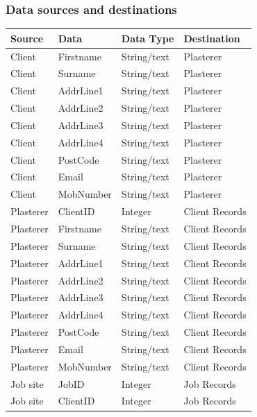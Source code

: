 \subsubsection{Data sources and destinations}



\begin{flushleft}
\begin{longtable}{|p{3cm}|p{3cm}|p{3cm}|p{3cm}|}
\hline
\textbf{Source} & \textbf{Data} & \textbf{Data Type} & \textbf{Destination}  \\ \hline
Client & Firstname & String/text & Plasterer \\ \hline 
Client & Surname   & String/text & Plasterer \\ \hline
Client & AddrLine1 & String/text & Plasterer \\ \hline
Client & AddrLine2 & String/text & Plasterer \\ \hline
Client & AddrLine3 & String/text & Plasterer \\ \hline
Client & AddrLine4 & String/text & Plasterer \\ \hline
Client & PostCode  & String/text & Plasterer \\ \hline
Client & Email     & String/text & Plasterer \\ \hline
Client & MobNumber & String/text & Plasterer \\ \hline   
Plasterer & ClientID & Integer & Client Records \\ \hline
Plasterer & Firstname & String/text & Client Records \\ \hline 
Plasterer & Surname   & String/text & Client Records \\ \hline
Plasterer & AddrLine1 & String/text & Client Records \\ \hline
Plasterer & AddrLine2 & String/text & Client Records \\ \hline
Plasterer & AddrLine3 & String/text & Client Records \\ \hline
Plasterer & AddrLine4 & String/text & Client Records \\ \hline
Plasterer & PostCode  & String/text & Client Records \\ \hline
Plasterer & Email     & String/text & Client Records \\ \hline
Plasterer & MobNumber & String/text & Client Records \\ \hline   
Job site & JobID & Integer & Job Records \\ \hline
Job site & ClientID & Integer & Job Records \\ \hline

\end{longtable}
\end{flushleft}
